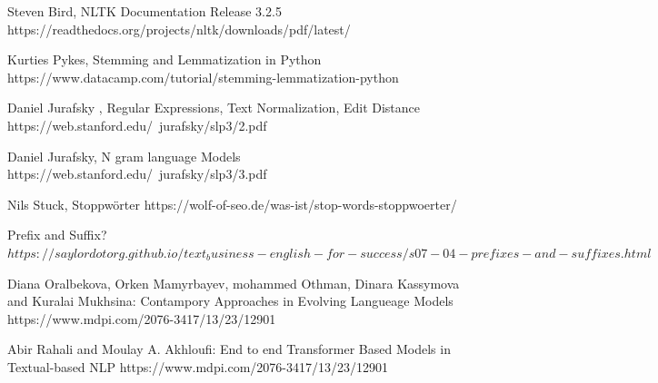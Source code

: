 \documentclass[12pt]{article}
\begin{document}
\begin{thebibliography}{9}
	Steven Bird, NLTK Documentation Release 3.2.5
	https://readthedocs.org/projects/nltk/downloads/pdf/latest/

	Kurties Pykes, Stemming and Lemmatization in Python
	https://www.datacamp.com/tutorial/stemming-lemmatization-python

	Daniel Jurafsky , Regular Expressions, Text Normalization, Edit Distance
	https://web.stanford.edu/~jurafsky/slp3/2.pdf

	Daniel Jurafsky, N gram language Models
	https://web.stanford.edu/~jurafsky/slp3/3.pdf

	Nils Stuck, Stoppwörter
	https://wolf-of-seo.de/was-ist/stop-words-stoppwoerter/

	Prefix and Suffix?
	$https://saylordotorg.github.io/text_business-english-for-success/s07-04-prefixes-and-suffixes.html$

	Diana Oralbekova, Orken Mamyrbayev, mohammed Othman, Dinara Kassymova and Kuralai Mukhsina: Contampory Approaches in Evolving  Langueage Models
	https://www.mdpi.com/2076-3417/13/23/12901

	Abir Rahali and Moulay A. Akhloufi: End to end Transformer Based Models in Textual-based NLP
	https://www.mdpi.com/2076-3417/13/23/12901

\end{thebibliography}
\end{document}
